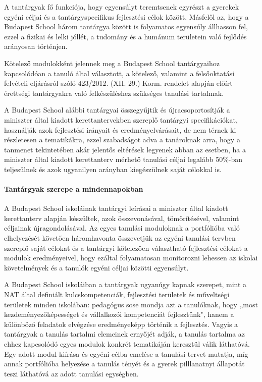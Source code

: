 A tantárgyak fő funkciója, hogy egyensúlyt teremtsenek egyrészt a gyerekek egyéni céljai és a tantárgyspecifikus fejlesztési célok között. Másfelől az, hogy a Budapest School három tantárgya között is folyamatos egyensúly állhasson fel, ezzel a fizikai és lelki jóllét, a tudomány és a humánum területein való fejlődés arányosan történjen.

Kötelező modulokként jelennek meg a Budapest School tantárgyaihoz kapcsolódóan a tanuló által választott, a kötelező, valamint a felsőoktatási felvételi eljárásról szóló 423/2012. (XII. 29.) Korm. rendelet alapján előírt érettségi tantárgyakra való felkészüléshez szükséges tanulási tartalmak. 

A Budapest School alábbi tantárgyai összegyűjtik és újracsoportosítják a miniszter által kiadott kerettantervekben szereplő tantárgyi specifikációkat, használják azok fejlesztési irányait és eredményelvárásait, de nem térnek ki részletesen a tematikákra, ezzel szabadságot adva a tanároknak arra, hogy a tanmenet tekintetében akár jelentős eltérések legyenek abban az esetben, ha a miniszter által kiadott kerettanterv mérhető tanulási céljai legalább 50\%-ban teljesülnek és azok ugyanilyen arányban kiegészülnek saját célokkal is.

\paragraph{Tantárgyak szerepe a mindennapokban}

A Budapest School iskoláinak tantárgyi leírásai a miniszter által kiadott kerettanterv alapján készültek, azok összevonásával, tömörítésével, valamint céljainak újragondolásával. Az egyes tanulási moduloknak a portfólióba való elhelyezését követően háromhavonta összevetjük az egyéni tanulási tervben szereplő saját célokat és a tantárgyi kötelezően választható fejlesztési célokat a modulok eredményeivel, hogy ezáltal folyamatosan monitorozni lehessen az iskolai követelmények és a tanulók egyéni céljai közötti egyensúlyt.

A Budapest School iskoláiban a tantárgyak ugyanúgy kapnak szerepet, mint a NAT által definiált kulcskompetenciák, fejlesztési területek és műveltségi területek minden iskolában: pedagógus sose mondja azt a tanulóknak, hogy „most kezdeményezőképességet és vállalkozói kompetenciát fejlesztünk", hanem a különböző feladatok elvégzése eredményeképp történik a fejlesztés. Vagyis a tantárgyak a tanulás tartalmi elemeinek ernyőjét adják, a tanulás tartalma az ehhez kapcsolódó egyes modulok konkrét tematikáján keresztül válik láthatóvá. Egy adott modul kiírása és egyéni célba emelése a tanulási tervet mutatja, míg annak portfólióba helyezése a tanulás tényét és a gyerek pilllanatnyi állapotát teszi láthatóvá az adott tanulási egységben.

